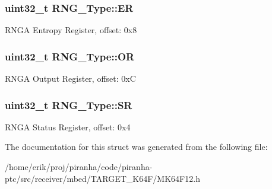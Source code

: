 \subsubsection[{\texorpdfstring{ER}{ER}}]{ uint32\+\_\+t R\+N\+G\+\_\+\+Type\+::\+ER}\hypertarget{structRNG__Type_a40849dd4f2a671fe31d55046aff91cd6}{}\label{structRNG__Type_a40849dd4f2a671fe31d55046aff91cd6}
R\+N\+GA Entropy Register, offset\+: 0x8 
\subsubsection[{\texorpdfstring{OR}{OR}}]{ uint32\+\_\+t R\+N\+G\+\_\+\+Type\+::\+OR}\hypertarget{structRNG__Type_ad59205cea4b6417e6cae229001ab24d4}{}\label{structRNG__Type_ad59205cea4b6417e6cae229001ab24d4}
R\+N\+GA Output Register, offset\+: 0xC 
\subsubsection[{\texorpdfstring{SR}{SR}}]{ uint32\+\_\+t R\+N\+G\+\_\+\+Type\+::\+SR}\hypertarget{structRNG__Type_a4d72ce4858cff5da811b489b0f3d41a8}{}\label{structRNG__Type_a4d72ce4858cff5da811b489b0f3d41a8}
R\+N\+GA Status Register, offset\+: 0x4 

The documentation for this struct was generated from the following file\+:\begin{DoxyCompactItemize}
\item 
/home/erik/proj/piranha/code/piranha-\/ptc/src/receiver/mbed/\+T\+A\+R\+G\+E\+T\+\_\+\+K64\+F/M\+K64\+F12.\+h\end{DoxyCompactItemize}
